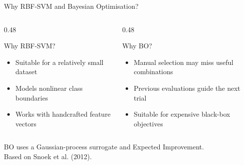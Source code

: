 \documentclass{beamer}
\begin{document}
\begin{frame}{Why RBF-SVM and Bayesian Optimisation?}
  \begin{columns}[T]
    \begin{column}{0.48\textwidth}
      \begin{block}{Why RBF-SVM?}
        \begin{itemize}
          \item Suitable for a relatively small dataset
          \item Models nonlinear class boundaries
          \item Works with handcrafted feature vectors
        \end{itemize}
      \end{block}
    \end{column}

    \begin{column}{0.48\textwidth}
      \begin{block}{Why BO?}
        \begin{itemize}
          \item Manual selection may miss useful combinations
          \item Previous evaluations guide the next trial
          \item Suitable for expensive black-box objectives
        \end{itemize}
      \end{block}
    \end{column}
  \end{columns}

  \vspace{0.25cm}
  \centering
  \small BO uses a Gaussian-process surrogate and Expected Improvement.\\
  \scriptsize Based on Snoek et al. (2012).
\end{frame}
\end{document}
